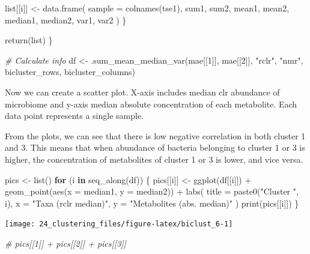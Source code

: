 \documentclass[
]{book}
\newenvironment{Shaded}{\begin{snugshade}}{\end{snugshade}}
\newcommand{\AttributeTok}[1]{\textcolor[rgb]{0.77,0.63,0.00}{#1}}
\newcommand{\CommentTok}[1]{\textcolor[rgb]{0.56,0.35,0.01}{\textit{#1}}}
\newcommand{\ControlFlowTok}[1]{\textcolor[rgb]{0.13,0.29,0.53}{\textbf{#1}}}
\newcommand{\DecValTok}[1]{\textcolor[rgb]{0.00,0.00,0.81}{#1}}
\newcommand{\FunctionTok}[1]{\textcolor[rgb]{0.00,0.00,0.00}{#1}}
\newcommand{\NormalTok}[1]{#1}
\newcommand{\OtherTok}[1]{\textcolor[rgb]{0.56,0.35,0.01}{#1}}
\newcommand{\SpecialCharTok}[1]{\textcolor[rgb]{0.00,0.00,0.00}{#1}}
\newcommand{\StringTok}[1]{\textcolor[rgb]{0.31,0.60,0.02}{#1}}
\begin{document}
\begin{Shaded}
\begin{Highlighting}[]
\NormalTok{    list[[i]] }\OtherTok{\textless{}{-}} \FunctionTok{data.frame}\NormalTok{(}
      \AttributeTok{sample =} \FunctionTok{colnames}\NormalTok{(tse1), sum1, sum2, mean1, mean2,}
\NormalTok{      median1, median2, var1, var2}
\NormalTok{    )}
\NormalTok{  \}}

  \FunctionTok{return}\NormalTok{(list)}
\NormalTok{\}}

\CommentTok{\# Calculate info}
\NormalTok{df }\OtherTok{\textless{}{-}} \FunctionTok{.sum\_mean\_median\_var}\NormalTok{(mae[[}\DecValTok{1}\NormalTok{]], mae[[}\DecValTok{2}\NormalTok{]], }\StringTok{"rclr"}\NormalTok{, }\StringTok{"nmr"}\NormalTok{, bicluster\_rows, bicluster\_columns)}
\end{Highlighting}
\end{Shaded}

Now we can create a scatter plot. X-axis includes median clr abundance
of microbiome and y-axis median absolute concentration of each
metabolite. Each data point represents a single sample.

From the plots, we can see that there is low negative correlation in
both cluster 1 and 3. This means that when abundance of bacteria
belonging to cluster 1 or 3 is higher, the concentration of
metabolites of cluster 1 or 3 is lower, and vice versa.

\begin{Shaded}
\begin{Highlighting}[]
\NormalTok{pics }\OtherTok{\textless{}{-}} \FunctionTok{list}\NormalTok{()}
\ControlFlowTok{for}\NormalTok{ (i }\ControlFlowTok{in} \FunctionTok{seq\_along}\NormalTok{(df)) \{}
\NormalTok{  pics[[i]] }\OtherTok{\textless{}{-}} \FunctionTok{ggplot}\NormalTok{(df[[i]]) }\SpecialCharTok{+}
    \FunctionTok{geom\_point}\NormalTok{(}\FunctionTok{aes}\NormalTok{(}\AttributeTok{x =}\NormalTok{ median1, }\AttributeTok{y =}\NormalTok{ median2)) }\SpecialCharTok{+}
    \FunctionTok{labs}\NormalTok{(}
      \AttributeTok{title =} \FunctionTok{paste0}\NormalTok{(}\StringTok{"Cluster "}\NormalTok{, i),}
      \AttributeTok{x =} \StringTok{"Taxa (rclr median)"}\NormalTok{,}
      \AttributeTok{y =} \StringTok{"Metabolites (abs. median)"}
\NormalTok{    )}
  \FunctionTok{print}\NormalTok{(pics[[i]])}
\NormalTok{\}}
\end{Highlighting}
\end{Shaded}

\texttt{[image: 24\_clustering\_files/figure-latex/biclust\_6-1]}

\begin{Shaded}
\begin{Highlighting}[]
\CommentTok{\# pics[[1]] + pics[[2]] + pics[[3]]}
\end{Highlighting}
\end{Shaded}
\end{document}
